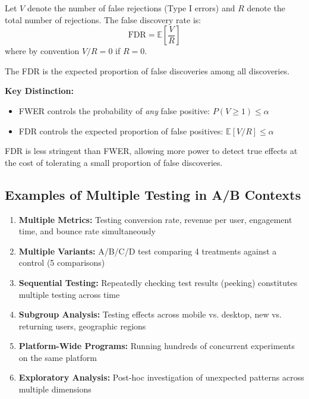 \begin{definition}
Let $V$ denote the number of false rejections (Type I errors) and $R$ denote the total number of rejections. The false discovery rate is:
\begin{equation}
\text{FDR} = \mathbb{E}\left[\frac{V}{R}\right]
\end{equation}
where by convention $V/R = 0$ if $R = 0$.

The FDR is the expected proportion of false discoveries among all discoveries.
\end{definition}

\textbf{Key Distinction:}
\begin{itemize}
    \item FWER controls the probability of \textit{any} false positive: $P(V \geq 1) \leq \alpha$
    \item FDR controls the expected proportion of false positives: $\mathbb{E}[V/R] \leq \alpha$
\end{itemize}

FDR is less stringent than FWER, allowing more power to detect true effects at the cost of tolerating a small proportion of false discoveries.

\subsection{Examples of Multiple Testing in A/B Contexts}

\begin{enumerate}
    \item \textbf{Multiple Metrics:} Testing conversion rate, revenue per user, engagement time, and bounce rate simultaneously

    \item \textbf{Multiple Variants:} A/B/C/D test comparing 4 treatments against a control (5 comparisons)

    \item \textbf{Sequential Testing:} Repeatedly checking test results (peeking) constitutes multiple testing across time

    \item \textbf{Subgroup Analysis:} Testing effects across mobile vs. desktop, new vs. returning users, geographic regions

    \item \textbf{Platform-Wide Programs:} Running hundreds of concurrent experiments on the same platform

    \item \textbf{Exploratory Analysis:} Post-hoc investigation of unexpected patterns across multiple dimensions
\end{enumerate}

